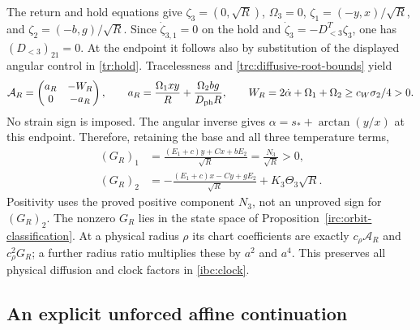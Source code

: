 The return and hold equations give
$\zeta_3=(0,\sqrt R)$, $\Omega_3=0$,
$\zeta_1=(-y,x)/\sqrt R$, and $\zeta_2=(-b,g)/\sqrt R$.
Since $\dot\zeta_{3,1}=0$ on the hold and
$\dot\zeta_3=-D_{<3}^T\zeta_3$, one has
$(D_{<3})_{21}=0$.  At the endpoint it follows also by substitution
of the displayed angular control in \eqref{tr:hold}.  Tracelessness
and \eqref{trc:diffusive-root-bounds} yield
\begin{equation}\label{irc:triangular-return}
 \mathcal A_R=
 \begin{pmatrix}a_R&-W_R\\0&-a_R\end{pmatrix},\qquad
 a_R=\frac{\Omega_1xy}{R}
       +\frac{\Omega_2bg}{D_{\rm ph}R},\qquad
 W_R=2\dot\alpha+\Omega_1+\Omega_2
       \geq c_W\sigma_2/4>0.
\end{equation}
No strain sign is imposed.  The angular inverse gives
$\alpha=s_*+\arctan(y/x)$ at this endpoint.  Therefore, retaining
the base and all three temperature terms,
\begin{equation}\label{irc:exact-return-temperature}
 \begin{aligned}
 (G_R)_1&=\frac{(E_1+c)y+Cx+bE_2}{\sqrt R}
          =\frac{N_3}{\sqrt R}>0,\\
 (G_R)_2&=-\frac{(E_1+c)x-Cy+gE_2}{\sqrt R}
             +K_3\Theta_3\sqrt R.
 \end{aligned}
\end{equation}
Positivity uses the proved positive component $N_3$, not an
unproved sign for $(G_R)_2$.  The nonzero $G_R$ lies in the state
space of Proposition~\ref{irc:orbit-classification}.  At a physical
radius $\rho$ its chart coefficients are exactly
$c_\rho\mathcal A_R$ and $c_\rho^2G_R$; a further radius ratio
multiplies these by $a^2$ and $a^4$.  This preserves all physical
diffusion and clock factors in \eqref{ibc:clock}.

\subsection{An explicit unforced affine continuation}

